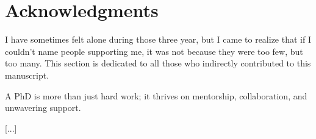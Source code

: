 \chapter*{Acknowledgments}
I have sometimes felt alone during those three year, but I came to realize that if I couldn't name people supporting me, it was not because they were too few, but too many.
This section is dedicated to all those who indirectly contributed to this manuscript.

A PhD is more than just hard work; it thrives on mentorship, collaboration, and unwavering support.

[...]